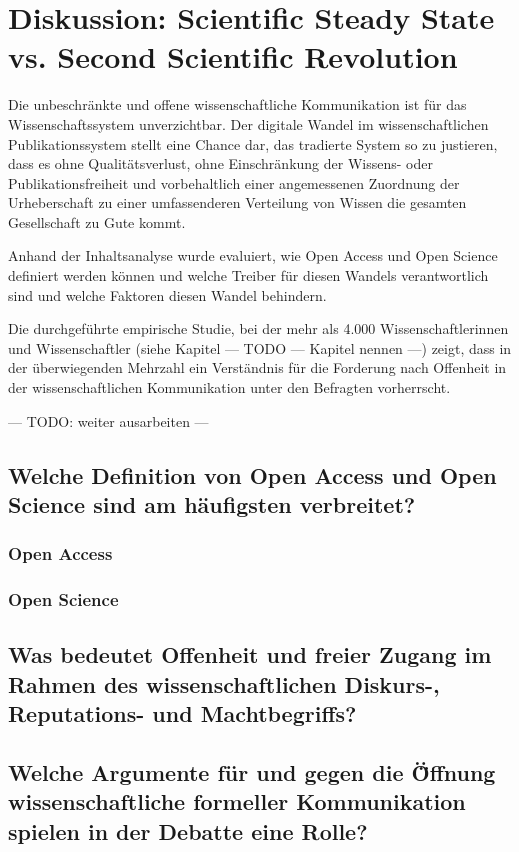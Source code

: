 \chapter{Diskussion: Scientific Steady State vs. Second Scientific Revolution}

Die unbeschränkte und offene wissenschaftliche Kommunikation ist für das Wissenschaftssystem unverzichtbar. Der digitale Wandel im wissenschaftlichen Publikationssystem stellt eine Chance dar, das tradierte System so zu justieren, dass es ohne Qualitätsverlust, ohne Einschränkung der Wissens- oder Publikationsfreiheit und vorbehaltlich einer angemessenen Zuordnung der Urheberschaft zu einer umfassenderen Verteilung von Wissen die gesamten Gesellschaft zu Gute kommt.

Anhand der Inhaltsanalyse wurde evaluiert, wie Open Access und Open Science definiert werden können und welche Treiber für diesen Wandels verantwortlich sind und welche Faktoren diesen Wandel behindern.

Die durchgeführte empirische Studie, bei der mehr als 4.000 Wissenschaftlerinnen und Wissenschaftler (siehe Kapitel --- TODO --- Kapitel nennen ---) zeigt, dass in der überwiegenden Mehrzahl ein Verständnis für die Forderung nach Offenheit in der wissenschaftlichen Kommunikation unter den Befragten vorherrscht.

--- TODO: weiter ausarbeiten ---

\section{Welche Definition von Open Access und Open Science sind am häufigsten verbreitet?}

\subsection{Open Access}

\subsection{Open Science}

\section{Was bedeutet Offenheit und freier Zugang im Rahmen des wissenschaftlichen Diskurs-, Reputations- und Machtbegriffs?}

\section{Welche Argumente für und gegen die Ö̈ffnung wissenschaftliche formeller Kommunikation spielen in der Debatte eine Rolle?}

